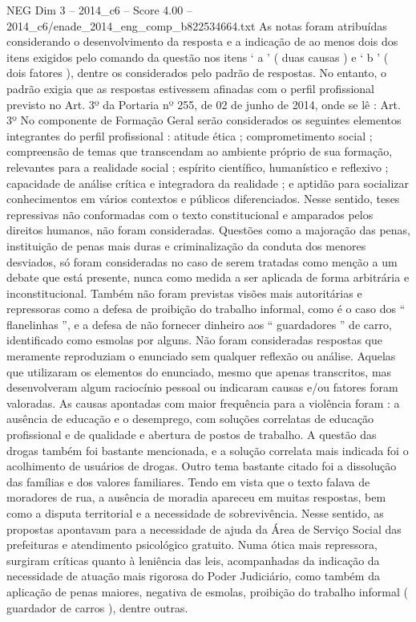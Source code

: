 \begin{textsample}{NEG Dim 3 – 2014\_c6 – Score 4.00 – 2014\_c6/enade\_2014\_eng\_comp\_b822534664.txt}
As notas foram atribuídas considerando o desenvolvimento da resposta e a indicação de ao menos dois dos itens exigidos pelo comando da questão nos itens ‘ a ’ ( duas causas ) e ‘ b ’ ( dois fatores ), dentre os considerados pelo padrão de respostas.
No entanto, o padrão exigia que as respostas estivessem afinadas com o perfil profissional previsto no Art. 3º da Portaria nº 255, de 02 de junho de 2014, onde se lê : Art. 3º No componente de Formação Geral serão considerados os seguintes elementos integrantes do perfil profissional : atitude ética ; comprometimento social ; compreensão de temas que transcendam ao ambiente próprio de sua formação, relevantes para a realidade social ; espírito científico, humanístico e reflexivo ; capacidade de análise crítica e integradora da realidade ; e aptidão para socializar conhecimentos em vários contextos e públicos diferenciados.
Nesse sentido, teses repressivas não conformadas com o texto constitucional e amparados pelos direitos humanos, não foram consideradas.
Questões como a majoração das penas, instituição de penas mais duras e criminalização da conduta dos menores desviados, só foram consideradas no caso de serem tratadas como menção a um debate que está presente, nunca como medida a ser aplicada de forma arbitrária e inconstitucional.
Também não foram previstas visões mais autoritárias e repressoras como a defesa de proibição do trabalho informal, como é o caso dos “ flanelinhas ”, e a defesa de não fornecer dinheiro aos “ guardadores ” de carro, identificado como esmolas por alguns.
Não foram consideradas respostas que meramente reproduziam o enunciado sem qualquer reflexão ou análise.
Aquelas que utilizaram os elementos do enunciado, mesmo que apenas transcritos, mas desenvolveram algum raciocínio pessoal ou indicaram causas e/ou fatores foram valoradas.
As causas apontadas com maior frequência para a violência foram : a ausência de educação e o desemprego, com soluções correlatas de educação profissional e de qualidade e abertura de postos de trabalho.
A questão das drogas também foi bastante mencionada, e a solução correlata mais indicada foi o acolhimento de usuários de drogas.
Outro tema bastante citado foi a dissolução das famílias e dos valores familiares.
Tendo em vista que o texto falava de moradores de rua, a ausência de moradia apareceu em muitas respostas, bem como a disputa territorial e a necessidade de sobrevivência.
Nesse sentido, as propostas apontavam para a necessidade de ajuda da Área de Serviço Social das prefeituras e atendimento psicológico gratuito.
Numa ótica mais repressora, surgiram críticas quanto à leniência das leis, acompanhadas da indicação da necessidade de atuação mais rigorosa do Poder Judiciário, como também da aplicação de penas maiores, negativa de esmolas, proibição do trabalho informal ( guardador de carros ), dentre outras.

\end{textsample}
